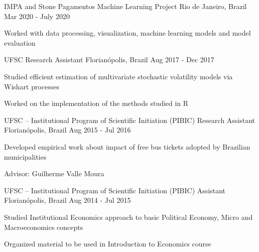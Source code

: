 

\begin{cventries}

 
 \cventry
    {IMPA and Stone Pagamentos} %
    {Machine Learning Project} %
    {Rio de Janeiro, Brazil} %
    {Mar 2020 - July 2020} %
    {
      \begin{cvitems} %
        \item{Worked with data processing, visualization, machine learning models and model evaluation}
      \end{cvitems}
    }
 
 
  \cventry
    {UFSC} %
    {Research Assistant} %
    {Florianópolis, Brazil} %
    {Aug 2017 - Dec 2017} %
    {
      \begin{cvitems} %
        \item {Studied efficient estimation of multivariate stochastic volatility models via Wishart processes}
        \item{Worked on the implementation of the methods studied in R}
      \end{cvitems}
    }

    \cventry
    {UFSC -- Institutional Program of Scientific Initiation (PIBIC)} %
    {Research Assistant} %
    {Florianópolis, Brazil} %
    {Aug 2015 - Jul 2016} %
    {
      \begin{cvitems} %
        \item {Developed empirical work about impact of free bus tickets adopted by Brazilian municipalities}
        \item {Advisor: Guilherme Valle Moura}
      \end{cvitems}
    }
    
    \cventry
    {UFSC -- Institutional Program of Scientific Initiation (PIBIC)} %
    {Assistant} %
    {Florianópolis, Brazil} %
    {Aug 2014 - Jul 2015} %
    {
      \begin{cvitems} %
        \item {Studied Institutional Economics approach to basic Political Economy, Micro and Macroeconomics concepts}
        \item{Organized material to be used in Introduction to Economics course}
      \end{cvitems}
    }


\end{cventries}
